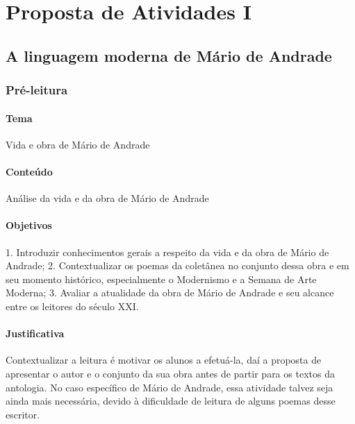 \documentclass[11pt]{extarticle}
\begin{document}

\tableofcontents

\section{Proposta de Atividades I}

\subsection{A linguagem moderna de Mário de Andrade}

\subsubsection{Pré-leitura}





\paragraph{Tema} Vida e obra de Mário de Andrade


\paragraph{Conteúdo} Análise da vida e da obra de Mário de Andrade

\paragraph{Objetivos} 1. Introduzir conhecimentos gerais a respeito da
vida e da obra de Mário de Andrade; 2. Contextualizar os poemas da
coletânea no conjunto dessa obra e em seu momento histórico,
especialmente o Modernismo e a Semana de Arte Moderna; 3. Avaliar a
atualidade da obra de Mário de Andrade e seu alcance entre os leitores
do século XXI.

\paragraph{Justificativa} Contextualizar a leitura é motivar os alunos a
efetuá-la, daí a proposta de apresentar o autor e o conjunto da sua obra
antes de partir para os textos da antologia. No caso específico de Mário
de Andrade, essa atividade talvez seja ainda mais necessária, devido à
dificuldade de leitura de alguns poemas desse escritor.
\end{document}
